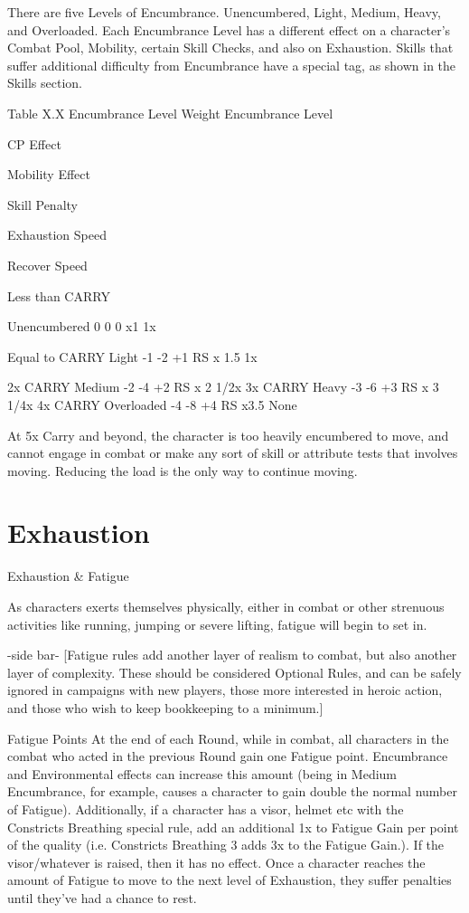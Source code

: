 \documentclass[oneside,11pt,english]{book}
\begin{document}
 

There are five Levels of Encumbrance. Unencumbered, Light, Medium, Heavy, and Overloaded. 
Each Encumbrance Level has a different effect on a character’s Combat Pool, Mobility, certain Skill 
Checks, and also on Exhaustion. 
Skills that suffer additional difficulty from Encumbrance have a special tag, as shown in the Skills 
section. 

 

Table X.X Encumbrance Level 
Weight Encumbrance 
Level 

CP 
Effect 

Mobility 
Effect 

Skill 
Penalty 

Exhaustion 
Speed 

Recover 
Speed 

Less than 
CARRY 

Unencumbered 0 0 0 x1 1x 

Equal to CARRY Light -1 -2 +1 RS x 1.5 1x 


2x CARRY Medium -2 -4 +2 RS x 2 1/2x 
3x CARRY Heavy -3 -6 +3 RS x 3 1/4x 
4x CARRY Overloaded -4 -8 +4 RS x3.5 None 

 
At 5x Carry and beyond, the character is too heavily encumbered to move, and cannot engage in combat 
or make any sort of skill or attribute tests that involves moving. Reducing the load is the only way to 
continue moving. 


\section{\label{sec:exhaustion}Exhaustion}

 
Exhaustion \& Fatigue 

 

As characters exerts themselves physically, either in combat or other strenuous activities like running, 
jumping or severe lifting, fatigue will begin to set in. 

 

-side bar- 
[Fatigue rules add another layer of realism to combat, but also another layer of complexity. These 
should be considered Optional Rules, and can be safely ignored in campaigns with new players, 
those more interested in heroic action, and those who wish to keep bookkeeping to a minimum.] 

 

Fatigue Points 
At the end of each Round, while in combat, all characters in the combat who acted in the previous Round 
gain one Fatigue point. Encumbrance and Environmental effects can increase this amount (being in 
Medium Encumbrance, for example, causes a character to gain double the normal number of Fatigue). 
Additionally, if a character has a visor, helmet etc with the Constricts Breathing special rule, add an 
additional 1x to Fatigue Gain per point of the quality (i.e. Constricts Breathing 3 adds 3x to the Fatigue 
Gain.). If the visor/whatever is raised, then it has no effect. Once a character reaches the amount of 
Fatigue to move to the next level of Exhaustion, they suffer penalties until they’ve had a chance to rest. 
\end{document}
